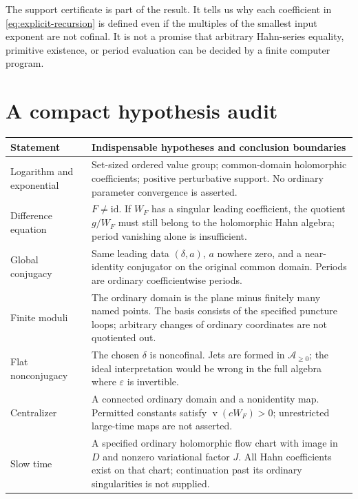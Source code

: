 \documentclass[11pt,a4paper]{article}
\numberwithin{equation}{section}
\theoremstyle{definition}
\theoremstyle{remark}
\newcommand{\A}{\mathcal A}
\newcommand{\eps}{\varepsilon}
\newcommand{\id}{\mathrm{id}}
\newcommand{\val}{\operatorname{v}}
\begin{document}
The support certificate is part of the result.  It tells us why each
coefficient in \eqref{eq:explicit-recursion} is defined even if the
multiples of the smallest input exponent are not cofinal.  It is not a
promise that arbitrary Hahn-series equality, primitive existence, or
period evaluation can be decided by a finite computer program.

\section{A compact hypothesis audit}
\label{app:audit}

\begin{longtable}{@{}p{}p{}@{}}
\toprule
Statement & Indispensable hypotheses and conclusion boundaries\\
\midrule
\endhead
Logarithm and exponential &
Set-sized ordered value group; common-domain holomorphic coefficients;
positive perturbative support.  No ordinary parameter convergence is
asserted.\\[5pt]
Difference equation &
$F\ne\id$.  If $W_F$ has a singular leading coefficient, the quotient
$g/W_F$ must still belong to the holomorphic Hahn algebra; period vanishing
alone is insufficient.\\[5pt]
Global conjugacy &
Same leading data $(\delta,a)$, $a$ nowhere zero, and a near-identity
conjugator on the original common domain.  Periods are ordinary
coefficientwise periods.\\[5pt]
Finite moduli &
The ordinary domain is the plane minus finitely many named points.
The basis consists of the specified puncture loops; arbitrary changes of
ordinary coordinates are not quotiented out.\\[5pt]
Flat nonconjugacy &
The chosen $\delta$ is noncofinal.  Jets are formed in
$\A_{\geq0}$; the ideal interpretation would be wrong in the full
algebra where $\eps$ is invertible.\\[5pt]
Centralizer &
A connected ordinary domain and a nonidentity map.  Permitted constants
satisfy $\val(cW_F)>0$; unrestricted large-time maps are not asserted.\\[5pt]
Slow time &
A specified ordinary holomorphic flow chart with image in $D$ and nonzero
variational factor $J$.  All Hahn coefficients exist on that chart;
continuation past its ordinary singularities is not supplied.\\
\bottomrule
\end{longtable}
\end{document}
